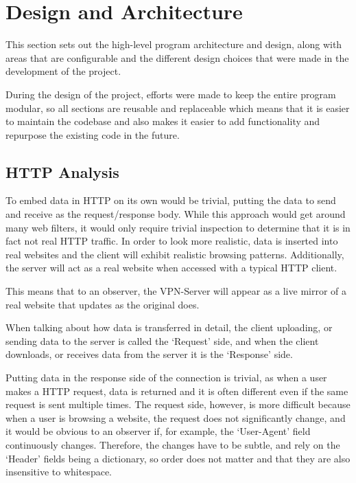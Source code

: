 \section{Design and Architecture}
This section sets out the high-level program architecture and design, along with areas that are configurable and the different design choices that were made in the development of the project.

During the design of the project, efforts were made to keep the entire program modular, so all sections are reusable and replaceable which means that it is easier to maintain the codebase and also makes it easier to add functionality and repurpose the existing code in the future.
\subsection{HTTP Analysis}
To embed data in HTTP on its own would be trivial, putting the data to send and receive as the request/response body. While this approach would get around many web filters, it would only require trivial inspection to determine that it is in fact not real HTTP traffic.
In order to look more realistic, data is inserted into real websites and the client will exhibit realistic browsing patterns. Additionally, the server will act as a real website when accessed with a typical HTTP client.

This means that to an observer, the VPN-Server will appear as a live mirror of a real website that updates as the original does.

When talking about how data is transferred in detail, the client uploading, or sending data to the server is called the `Request' side, and when the client downloads, or receives data from the server it is the `Response' side.

Putting data in the response side of the connection is trivial, as when a user makes a HTTP request, data is returned and it is often different even if the same request is sent multiple times.
The request side, however, is more difficult because when a user is browsing a website, the request does not significantly change, and it would be obvious to an observer if, for example, the `User-Agent' field continuously changes. Therefore, the changes have to be subtle, and rely on the `Header' fields being a dictionary, so order does not matter and that they are also insensitive to whitespace.

\newpage
